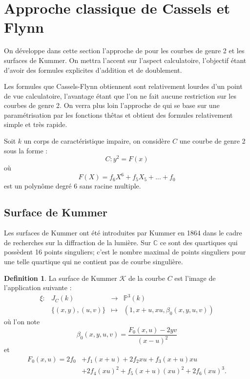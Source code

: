 \documentclass[a4paper]{article}
\theoremstyle{definition}
\newtheorem{definition}{Definition}[section]
\theoremstyle{remark}
\numberwithin{equation}{section}
\begin{document}
\section{Approche classique de Cassels et Flynn}
On développe dans cette section l'approche de \citet{cassels-Flynn} pour les courbes de genre 2 et les surfaces de Kummer. On mettra l'accent sur l'aspect calculatoire, l'objectif étant d'avoir des formules explicites d'addition et de doublement.

Les formules que Cassels-Flynn obtiennent sont relativement lourdes d'un point de vue calculatoire, l'avantage étant que l'on ne fait aucune restriction sur les courbes de genre 2. On verra plus loin l'approche de \citet{gaudry} qui se base sur une paramétrisation par les fonctions thêtas et obtient des formules relativement simple et très rapide.

Soit $k$ un corps de caractéristique impaire, on considère $C$ une courbe de genre 2 sous la forme :
$$C : y^2 = F(x)$$
où $$F(X) = f_6X^6 + f_5X_5 + ... + f_0$$ est un polynôme degré 6 sans racine multiple.

\subsection{Surface de Kummer}
Les surfaces de Kummer ont été introduites par Kummer en 1864 dans le cadre de recherches sur la diffraction de la lumière. Sur $\mathbb{C}$ ce sont des quartiques qui possèdent 16 points singuliers; c'est le nombre maximal de points singuliers pour une telle quartique qui ne contient pas de courbe singulière.

\begin{definition}
La surface de Kummer $\mathcal{K}$ de la courbe $C$ est l'image de l'application suivante :
\begin{equation*}
\begin{array}{lrcl}
\xi : &J_C(k) & \longrightarrow & \mathbb{P}^3(k) \\
& \{(x,y),(u,v)\} & \longmapsto & (1,x+u,xu,\beta_0(x,y,u,v))
\end{array}
\end{equation*}
où l'on note
$$\beta_0(x,y,u,v) = \frac{F_0(x,u)-2yv}{(x-u)^2}$$
et
\begin{align*}
F_0(x,u)=2f_0&+f_1(x+u)+2f_2xu+f_3(x+u)xu \\
&+2f_4(xu)^2+f_5(x+u)(xu)^2+2f_6(xu)^3.
\end{align*}
\end{definition}
\end{document}
